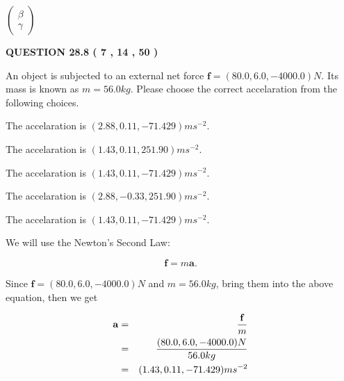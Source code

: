 \documentclass[12pt]{article}
\begin{document}
   
 $  \left( \begin{array}
 {
 c
 }
 \beta \\ 
 \gamma
 \end{array} \right) $ 
  
\vspace{0.2in}
  
{\textbf{\Large{QUESTION
28.8 
 (           7 ,          14 ,          50 )
}}}
  
  
 
An object is subjected to an external net force $\mathbf{f}=
(80.0 , 6.0 , -4000.0) N$.
Its mass is known as $m= %
56.0 kg$.
Please choose the correct accelaration from the following choices.
 
 
  The accelaration is $  %
(
2.88,
0.11,
-71.429)
ms^{-2} $.
 
 
  The accelaration is $  %
(
1.43,
0.11,
251.90)
ms^{-2} $.
 
 
  The accelaration is $  %
(
1.43,
0.11,
-71.429)
ms^{-2} $.
 
 
  The accelaration is $  %
(
2.88,
-0.33,
251.90)
ms^{-2} $.
 
 
\noindent{}
 
 
  The accelaration is $  %
(
1.43,
0.11,
-71.429)
ms^{-2} $.
 
 
\noindent{}
 
 
 
 
 
\noindent{}
 
 

We will use the Newton's Second Law:
 
\[
\mathbf{f}=m\mathbf{a}.
\]
 
Since $\mathbf{f}= %
(80.0 , 6.0 , -4000.0) N$
and $m= %
56.0kg$, bring them into the above equation, then we get
 
\begin{eqnarray*}
\mathbf{a}&=&\frac{\mathbf{f}}m  \\
&=&\frac{ %
(80.0 , 6.0 , -4000.0) N}{ %
56.0kg}  \\
&=& %
(1.43 , 0.11 , -71.429) ms^{-2}
\end{eqnarray*}
 
\end{document}
